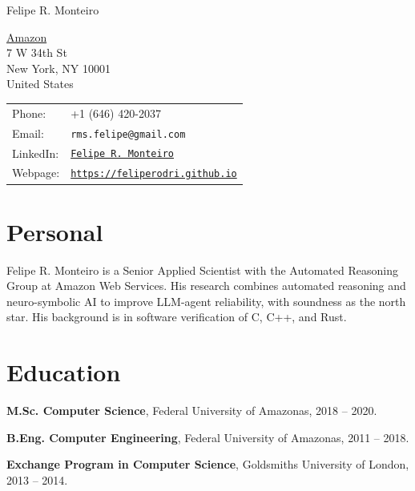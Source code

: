 \documentclass[letterpaper]{article}
\def\name{Felipe R. Monteiro}
\renewenvironment{itemize}{
  \begin{list}{}{
    \setlength{\leftmargin}{1.5em}
  }
}{
  \end{list}
}
\begin{document}
{\huge \name}


\vspace{0.25in}

\begin{minipage}{0.45\linewidth}
  \href{https://aws.amazon.com/security/provable-security/}{Amazon} \\
  7 W 34th St \\
 New York, NY 10001 \\
  United States
\end{minipage}
\hfill
\begin{minipage}{0.45\linewidth}
  \begin{tabular}{ll}
    Phone: & +1 (646) 420-2037 \\
    Email: & {\tt rms.felipe@gmail.com} \\
    LinkedIn: & \href{https://www.linkedin.com/in/felipe-r-monteiro-91643157/}{\tt Felipe R. Monteiro} \\
    Webpage: & \href{https://feliperodri.github.io}{\tt https://feliperodri.github.io} \\
  \end{tabular}
\end{minipage}

\section*{Personal}

Felipe R. Monteiro is a Senior Applied Scientist with the Automated Reasoning Group at Amazon Web Services. His research combines automated reasoning and neuro-symbolic AI to improve LLM-agent reliability, with soundness as the north star. His background is in software verification of C, C++, and Rust.

\section*{Education}

\begin{itemize}
  \item {\bf M.Sc. Computer Science}, Federal University of Amazonas, 2018 -- 2020.
  \item {\bf B.Eng. Computer Engineering}, Federal University of Amazonas, 2011 -- 2018.
  \begin{itemize}
    \item {\bf Exchange Program in Computer Science}, Goldsmiths University of London, 2013 -- 2014.
\end{itemize}
\end{itemize}
\end{document}
